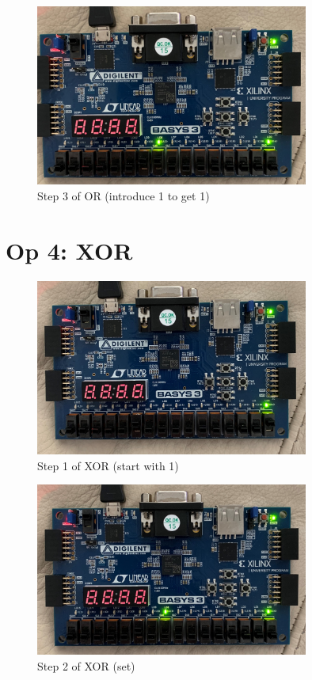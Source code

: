 \documentclass[11pt]{article}
\begin{document}
\begin{figure}[ht]\centering
	\includegraphics[width=0.8\textwidth,trim=0cm 0cm 0cm 0cm,clip]{or_step_3}
	\caption{Step 3 of OR (introduce 1 to get 1)}
	\label{fig:or_step_3}			
\end{figure}
\clearpage

\section*{Op 4: XOR}

\begin{figure}[ht]\centering
	\includegraphics[width=0.8\textwidth,trim=0cm 0cm 0cm 0cm,clip]{xor_step_1}
	\caption{Step 1 of XOR (start with 1)}
	\label{fig:xor_step_1}			
\end{figure}

\begin{figure}[ht]\centering
	\includegraphics[width=0.8\textwidth,trim=0cm 0cm 0cm 0cm,clip]{xor_step_2}
	\caption{Step 2 of XOR (set)}
	\label{fig:xor_step_2}			
\end{figure}
\end{document}
